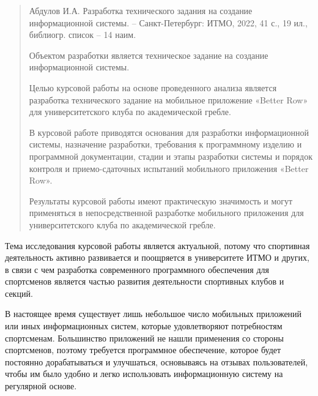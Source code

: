 \documentclass[14pt]{extreport}
\begin{document}
\pagestyle{empty}


\pagestyle{plain}

\begin{abstract}

\begin{minipage}{0.4\textwidth}
  
\end{minipage}
\hfill
\begin{minipage}{0.4\textwidth}
\begin{frame}

Абдулов И.А. Разработка технического задания на создание информационной системы. – Санкт-Петербург: ИТМО, 2022, 41 с., 19 ил., библиогр. список – 14 наим.

\end{frame}
\end{minipage}

\begin{figure} [H]
\end{figure}

Объектом разработки является техническое задание на создание информационной системы.

Целью курсовой работы на основе проведенного анализа является разработка технического задание на мобильное приложение «Better Row» для университетского клуба по академической гребле.

В курсовой работе приводятся основания для разработки информационной системы, назначение разработки, требования к программному изделию и программной документации, стадии и этапы разработки системы и порядок контроля и приемо-сдаточных испытаний мобильного приложения «Better Row».

Результаты курсовой работы имеют практическую значимость и могут применяться в непосредственной разработке мобильного приложения для университетского клуба по академической гребле.
\end{abstract}

\tableofcontents

\intro

Тема исследования курсовой работы является актуальной, потому что спортивная деятельность активно развивается и поощряется в университете ИТМО и других, в связи с чем разработка современного программного обеспечения для спортсменов является частью развития деятельности спортивных клубов и секций.

В настоящее время существует лишь небольшое число мобильных приложений или иных информационных систем, которые удовлетворяют потребностям спортсменам. Большинство приложений не нашли применения со стороны спортсменов, поэтому требуется программное обеспечение, которое будет постоянно дорабатываться и улучшаться, основываясь на отзывах пользователей, чтобы им было удобно и легко использовать информационную систему на регулярной основе.
\end{document}
